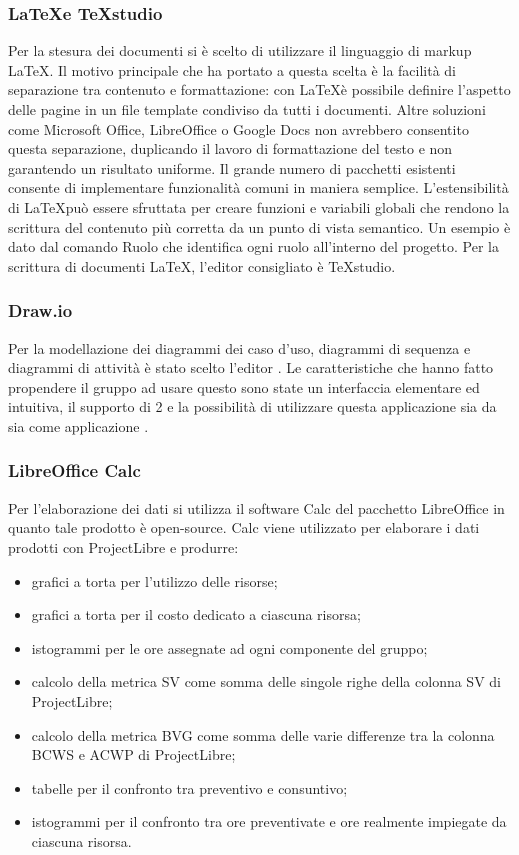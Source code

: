 \documentclass[12pt,a4paper]{article}
\begin{document}
\subsubsection{\LaTeX e TeXstudio}
Per la stesura dei documenti si è scelto di utilizzare il linguaggio di markup \LaTeX. Il motivo principale che ha portato a questa scelta è la facilità di separazione tra contenuto e formattazione: con \LaTeX è possibile definire l’aspetto delle pagine in un file template condiviso da tutti i documenti. Altre soluzioni come Microsoft Office, LibreOffice o Google Docs non avrebbero consentito questa separazione, duplicando il lavoro di formattazione del testo e non garantendo un risultato uniforme. Il grande numero di pacchetti esistenti consente di implementare funzionalità comuni in maniera semplice. L’estensibilità di \LaTeX può essere sfruttata per creare funzioni e variabili globali che rendono la scrittura del contenuto più corretta da un punto di vista semantico. Un esempio è dato dal comando Ruolo che identifica ogni ruolo all’interno del progetto. Per la scrittura di documenti \LaTeX, l’editor consigliato è TeXstudio.



\subsubsection{Draw.io}
Per la modellazione dei diagrammi dei caso d’uso, diagrammi di sequenza e diagrammi di attività è stato scelto l’editor \textit{}.		
Le caratteristiche che hanno fatto propendere il gruppo ad usare questo  sono state un interfaccia elementare ed intuitiva, il supporto di 2 e la possibilità di utilizzare questa applicazione sia da  sia come applicazione .

\subsubsection{LibreOffice Calc}
Per l’elaborazione dei dati si utilizza il software Calc del pacchetto LibreOffice in quanto tale prodotto è open-source.
Calc viene utilizzato per elaborare i dati prodotti con ProjectLibre e produrre:
\begin{itemize}
	\item grafici a torta per l’utilizzo delle risorse;
	\item grafici a torta per il costo dedicato a ciascuna risorsa;
	\item istogrammi per le ore assegnate ad ogni componente del gruppo;
	\item calcolo della metrica SV come somma delle singole righe della colonna SV di ProjectLibre;
	\item calcolo della metrica BVG come somma delle varie differenze tra la colonna BCWS e ACWP di ProjectLibre;
	\item tabelle per il confronto tra preventivo e consuntivo;
	\item istogrammi per il confronto tra ore preventivate e ore realmente impiegate da
	ciascuna risorsa.
\end{itemize}
\end{document}
